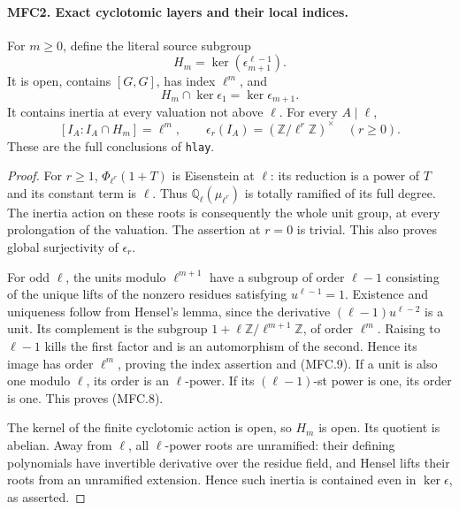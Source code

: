\paragraph{MFC2. Exact cyclotomic layers and their local indices.}
\label{claim:MFC2}
For \(m\ge0\), define the literal source subgroup
\[
 H_m=\ker(\epsilon_{m+1}^{\ell-1}).                         \tag{MFC.7}
\]
It is open, contains \([G,G]\), has index \(\ell^m\), and
\[
 H_m\cap\ker\epsilon_1=\ker\epsilon_{m+1}.                \tag{MFC.8}
\]
It contains inertia at every valuation not above \(\ell\).
For every \(A\mid\ell\),
\[
 [I_A:I_A\cap H_m]=\ell^m,
 \qquad\epsilon_r(I_A)=(\mathbb Z/\ell^r\mathbb Z)^\times
                         \quad(r\ge0).                    \tag{MFC.9}
\]
These are the full conclusions of \texttt{hlay}.

\begin{proof}
For \(r\ge1\), \(\Phi_{\ell^r}(1+T)\) is Eisenstein at
\(\ell\): its reduction is a power of \(T\) and its constant
term is \(\ell\).  Thus \(\mathbb Q_\ell(\mu_{\ell^r})\)
is totally ramified of its full degree.  The inertia action on
these roots is consequently the whole unit group, at every
prolongation of the valuation.  The assertion at \(r=0\) is
trivial.  This also proves global surjectivity of \(\epsilon_r\).

For odd \(\ell\), the units modulo \(\ell^{m+1}\) have a
subgroup of order \(\ell-1\) consisting of the unique lifts
of the nonzero residues satisfying \(u^{\ell-1}=1\).
Existence and uniqueness follow from Hensel's lemma, since the
derivative \((\ell-1)u^{\ell-2}\) is a unit.  Its complement
is the subgroup \(1+\ell\mathbb Z/\ell^{m+1}\mathbb Z\),
of order \(\ell^m\).  Raising to \(\ell-1\) kills the first
factor and is an automorphism of the second.  Hence its image
has order \(\ell^m\), proving the index assertion and (MFC.9).
If a unit is also one modulo \(\ell\), its order is an
\(\ell\)-power.  If its \((\ell-1)\)-st power is one, its
order is one.  This proves (MFC.8).

The kernel of the finite cyclotomic action is open, so \(H_m\)
is open.  Its quotient is abelian.  Away from \(\ell\), all
\(\ell\)-power roots are unramified: their defining polynomials
have invertible derivative over the residue field, and Hensel
lifts their roots from an unramified extension.  Hence such
inertia is contained even in \(\ker\epsilon\), as asserted.
\end{proof}

